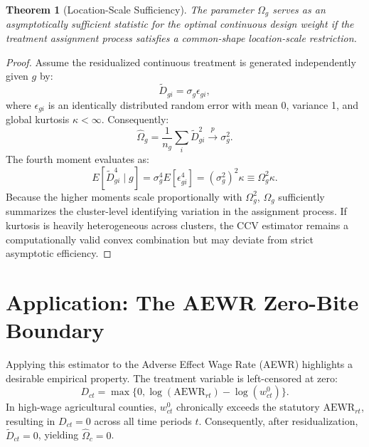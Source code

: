 \documentclass[11pt, letterpaper]{article}
\newtheorem{theorem}{Theorem}
\theoremstyle{remark}
\begin{document}
\begin{theorem}[Location-Scale Sufficiency]
The parameter $\Omega_g$ serves as an asymptotically sufficient statistic for the optimal continuous design weight if the treatment assignment process satisfies a common-shape location-scale restriction.
\end{theorem}
\begin{proof}
Assume the residualized continuous treatment is generated independently given $g$ by:
\begin{equation*}
    \widetilde D_{gi} = \sigma_g \epsilon_{gi},
\end{equation*}
where $\epsilon_{gi}$ is an identically distributed random error with mean 0, variance 1, and global kurtosis $\kappa < \infty$. Consequently:
\begin{equation*}
    \widehat\Omega_g = \frac{1}{n_g}\sum_{i} \widetilde D_{gi}^2 \xrightarrow{p} \sigma_g^2.
\end{equation*}
The fourth moment evaluates as:
\begin{equation*}
    E[\widetilde D_{gi}^4 \mid g] = \sigma_g^4 E[\epsilon_{gi}^4] = (\sigma_g^2)^2 \kappa \equiv \Omega_g^2 \kappa.
\end{equation*}
Because the higher moments scale proportionally with $\Omega_g^2$, $\Omega_g$ sufficiently summarizes the cluster-level identifying variation in the assignment process. If kurtosis is heavily heterogeneous across clusters, the CCV estimator remains a computationally valid convex combination but may deviate from strict asymptotic efficiency.
\end{proof}

\section{Application: The AEWR Zero-Bite Boundary}

Applying this estimator to the Adverse Effect Wage Rate (AEWR) highlights a desirable empirical property. The treatment variable is left-censored at zero:
\begin{equation*}
    D_{ct} = \max\{0, \log(\text{AEWR}_{rt}) - \log(w^0_{ct})\}.
\end{equation*}
In high-wage agricultural counties, $w^0_{ct}$ chronically exceeds the statutory $\text{AEWR}_{rt}$, resulting in $D_{ct} = 0$ across all time periods $t$. Consequently, after residualization, $\widetilde{D}_{ct} = 0$, yielding $\widehat\Omega_c = 0$.
\end{document}
